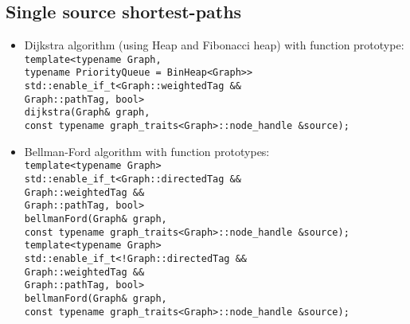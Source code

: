 \documentclass{article}
\begin{document}
\pagebreak

\subsection*{Single source shortest-paths}
\begin{itemize}
	\item Dijkstra algorithm (using Heap and Fibonacci heap) with function prototype:\\
		\texttt{template<typename Graph,\\\hspace*{4.75em}
			typename PriorityQueue = BinHeap<Graph>>\\
			std::enable\_if\_t<Graph::weightedTag \&\&\\\hspace*{7.67em}
			Graph::pathTag, bool>\\
			dijkstra(Graph\& graph,\\\hspace*{4.27em}
			const typename graph\_traits<Graph>::node\_handle \&source);}

	\item Bellman-Ford algorithm with function prototypes:\\
		\texttt{template<typename Graph>\\
			std::enable\_if\_t<Graph::directedTag \&\&\\\hspace*{7.67em}
			Graph::weightedTag \&\&\\\hspace*{7.67em}
			Graph::pathTag, bool>\\
			bellmanFord(Graph\& graph,\\\hspace*{5.5em}
			const typename graph\_traits<Graph>::node\_handle \&source);} \\

		\texttt{template<typename Graph>\\
			std::enable\_if\_t<!Graph::directedTag \&\&\\\hspace*{7.67em}
			Graph::weightedTag \&\&\\\hspace*{7.67em}
			Graph::pathTag, bool>\\
			bellmanFord(Graph\& graph,\\\hspace*{5.27em}
			const typename graph\_traits<Graph>::node\_handle \&source);}


\end{itemize}
\end{document}
